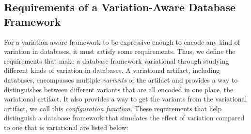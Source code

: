 \subsection{Requirements of a Variation-Aware Database Framework}
\label{sec:req}

For a variation-aware framework  to be expressive enough to encode
any kind of variation in databases, it must satisfy some requirements.
Thus, we define the requirements that make a database framework
variational through studying different kinds of variation in databases.  
A variational artifact, including databases, encompasses multiple 
\emph{variants} of the artifact and provides a way to distinguishes 
between different variants that are all encoded in one place, the 
variational artifact. It also provides a way to get the variants from
the variational artifact, we call this \emph{configuration function}.
%
These requirements that help distinguish a database framework that 
simulates the effect of variation compared to one that is variational are
listed below:

